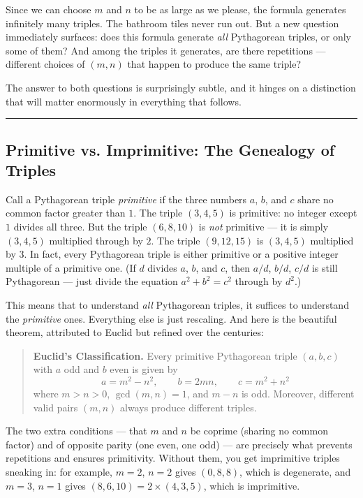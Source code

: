 \documentclass[11pt,openany]{book}
\theoremstyle{definition}
\theoremstyle{plain}
\theoremstyle{remark}
\begin{document}
Since we can choose $m$ and $n$ to be as large as we please, the formula generates infinitely many triples. The bathroom tiles never run out. But a new question immediately surfaces: does this formula generate \textit{all} Pythagorean triples, or only some of them? And among the triples it generates, are there repetitions — different choices of $(m, n)$ that happen to produce the same triple?

The answer to both questions is surprisingly subtle, and it hinges on a distinction that will matter enormously in everything that follows.

\bigskip\noindent\rule{\textwidth}{0.4pt}\bigskip


\subsection*{Primitive vs. Imprimitive: The Genealogy of Triples}


Call a Pythagorean triple \textit{primitive} if the three numbers $a$, $b$, and $c$ share no common factor greater than $1$. The triple $(3, 4, 5)$ is primitive: no integer except $1$ divides all three. But the triple $(6, 8, 10)$ is \textit{not} primitive — it is simply $(3, 4, 5)$ multiplied through by $2$. The triple $(9, 12, 15)$ is $(3, 4, 5)$ multiplied by $3$. In fact, every Pythagorean triple is either primitive or a positive integer multiple of a primitive one. (If $d$ divides $a$, $b$, and $c$, then $a/d$, $b/d$, $c/d$ is still Pythagorean — just divide the equation $a^2 + b^2 = c^2$ through by $d^2$.)

This means that to understand \textit{all} Pythagorean triples, it suffices to understand the \textit{primitive} ones. Everything else is just rescaling. And here is the beautiful theorem, attributed to Euclid but refined over the centuries:

\begin{quote}
\textbf{Euclid's Classification.} Every primitive Pythagorean triple $(a, b, c)$ with $a$ odd and $b$ even is given by
$$a = m^2 - n^2, \qquad b = 2mn, \qquad c = m^2 + n^2$$
where $m > n > 0$, $\gcd(m, n) = 1$, and $m - n$ is odd. Moreover, different valid pairs $(m, n)$ always produce different triples.
\end{quote}


The two extra conditions — that $m$ and $n$ be coprime (sharing no common factor) and of opposite parity (one even, one odd) — are precisely what prevents repetitions and ensures primitivity. Without them, you get imprimitive triples sneaking in: for example, $m = 2$, $n = 2$ gives $(0, 8, 8)$, which is degenerate, and $m = 3$, $n = 1$ gives $(8, 6, 10) = 2 \times (4, 3, 5)$, which is imprimitive.
\end{document}
